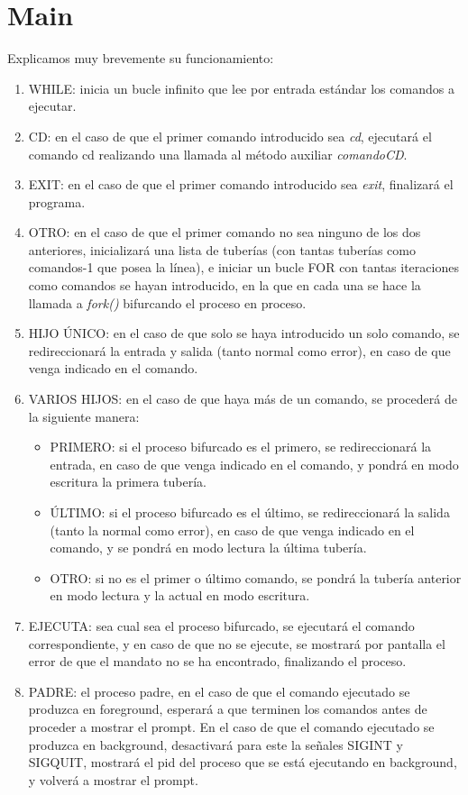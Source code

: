 \section{Main}
Explicamos muy brevemente su funcionamiento:
\begin{enumerate}
 \item WHILE: inicia un bucle infinito que lee por entrada estándar los comandos a ejecutar.
 \item CD: en el caso de que el primer comando introducido sea \textit{cd}, ejecutará el comando cd realizando una llamada al método auxiliar \textit{comandoCD}.
 \item EXIT: en el caso de que el primer comando introducido sea \textit{exit}, finalizará el programa.
 \item OTRO: en el caso de que el primer comando no sea ninguno de los dos anteriores, inicializará una lista de tuberías (con tantas tuberías como comandos-1 que posea la línea), e iniciar un bucle FOR con tantas iteraciones como comandos se hayan introducido, en la que en cada una se hace la llamada a \textit{fork()} bifurcando el proceso en proceso.
 \item HIJO ÚNICO: en el caso de que solo se haya introducido un solo comando, se redireccionará la entrada y salida (tanto normal como error), en caso de que venga indicado en el comando.
 \item VARIOS HIJOS: en el caso de que haya más de un comando, se procederá de la siguiente manera:
 \begin{itemize}
  \item PRIMERO: si el proceso bifurcado es el primero, se redireccionará la entrada, en caso de que venga indicado en el comando, y pondrá en modo escritura la primera tubería.
  \item ÚLTIMO: si el proceso bifurcado es el último, se redireccionará la salida (tanto la normal como error), en caso de que venga indicado en el comando, y se pondrá en modo lectura la última tubería.
  \item OTRO: si no es el primer o último comando, se pondrá la tubería anterior en modo lectura y la actual en modo escritura.
 \end{itemize}
 \item EJECUTA: sea cual sea el proceso bifurcado, se ejecutará el comando correspondiente, y en caso de que no se ejecute, se mostrará por pantalla el error de que el mandato no se ha encontrado, finalizando el proceso.
 \item PADRE: el proceso padre, en el caso de que el comando ejecutado se produzca en foreground, esperará a que terminen los comandos antes de proceder a mostrar el prompt. En el caso de que el comando ejecutado se produzca en background, desactivará para este la señales SIGINT y SIGQUIT, mostrará el pid del proceso que se está ejecutando en background, y volverá a mostrar el prompt.
\end{enumerate}
